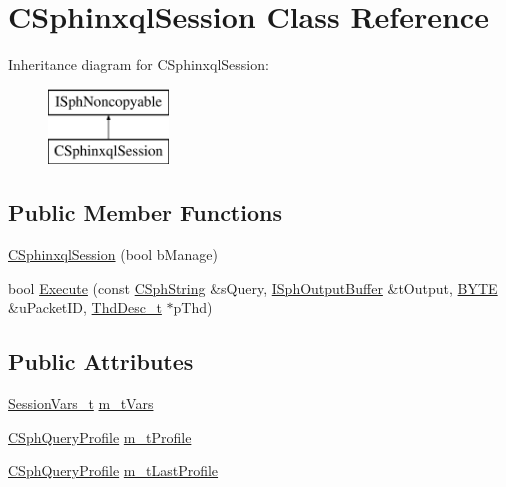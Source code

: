 \hypertarget{classCSphinxqlSession}{\section{C\-Sphinxql\-Session Class Reference}
\label{classCSphinxqlSession}
}
Inheritance diagram for C\-Sphinxql\-Session\-:\begin{figure}[H]
\begin{center}
\leavevmode
\includegraphics[height=2.000000cm]{classCSphinxqlSession}
\end{center}
\end{figure}
\subsection*{Public Member Functions}
\begin{DoxyCompactItemize}
\item 
\hyperlink{classCSphinxqlSession_a641651cd663755504642d82e4c526390}{C\-Sphinxql\-Session} (bool b\-Manage)
\item 
bool \hyperlink{classCSphinxqlSession_a8d648e430e52dd286490940301f8e2df}{Execute} (const \hyperlink{structCSphString}{C\-Sph\-String} \&s\-Query, \hyperlink{classISphOutputBuffer}{I\-Sph\-Output\-Buffer} \&t\-Output, \hyperlink{sphinxstd_8h_a4ae1dab0fb4b072a66584546209e7d58}{B\-Y\-T\-E} \&u\-Packet\-I\-D, \hyperlink{structThdDesc__t}{Thd\-Desc\-\_\-t} $\ast$p\-Thd)
\end{DoxyCompactItemize}
\subsection*{Public Attributes}
\begin{DoxyCompactItemize}
\item 
\hyperlink{structSessionVars__t}{Session\-Vars\-\_\-t} \hyperlink{classCSphinxqlSession_ad6557bdc798d05ced6a47a4c5d4ebb40}{m\-\_\-t\-Vars}
\item 
\hyperlink{classCSphQueryProfile}{C\-Sph\-Query\-Profile} \hyperlink{classCSphinxqlSession_a58ff8dc45380faae20f96f226f69de7b}{m\-\_\-t\-Profile}
\item 
\hyperlink{classCSphQueryProfile}{C\-Sph\-Query\-Profile} \hyperlink{classCSphinxqlSession_a6a2ef213af17c3e232423dbca7fc1038}{m\-\_\-t\-Last\-Profile}
\end{DoxyCompactItemize}
